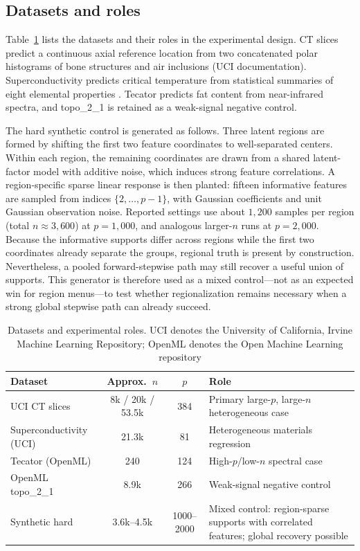 \documentclass[pdflatex,sn-basic,Numbered]{sn-jnl}
\begin{document}
\subsection{Datasets and roles}
\label{sec:datasets}

Table~\ref{tab:datasets} lists the datasets and their roles in the experimental design. CT slices predict a continuous axial reference location from two concatenated polar histograms of bone structures and air inclusions (UCI documentation). Superconductivity predicts critical temperature from statistical summaries of eight elemental properties \cite{hamidieh2018}. Tecator predicts fat content from near-infrared spectra, and topo\_2\_1 is retained as a weak-signal negative control.

The hard synthetic control is generated as follows. Three latent regions are formed by shifting the first two feature coordinates to well-separated centers. Within each region, the remaining coordinates are drawn from a shared latent-factor model with additive noise, which induces strong feature correlations. A region-specific sparse linear response is then planted: fifteen informative features are sampled from indices \(\{2,\ldots,p-1\}\), with Gaussian coefficients and unit Gaussian observation noise. Reported settings use about \(1{,}200\) samples per region (total \(n\approx 3{,}600\)) at \(p=1{,}000\), and analogous larger-\(n\) runs at \(p=2{,}000\). Because the informative supports differ across regions while the first two coordinates already separate the groups, regional truth is present by construction. Nevertheless, a pooled forward-stepwise path may still recover a useful union of supports. This generator is therefore used as a mixed control---not as an expected win for region menus---to test whether regionalization remains necessary when a strong global stepwise path can already succeed.

\begin{table}[t]
\centering
\caption{Datasets and experimental roles. UCI denotes the University of California, Irvine Machine Learning Repository; OpenML denotes the Open Machine Learning repository}
\label{tab:datasets}
\small
\begin{tabularx}{\textwidth}{@{}>{\raggedright\arraybackslash}p{}c c >{\raggedright\arraybackslash}X@{}}
\toprule
Dataset & Approx.\ \(n\) & \(p\) & Role \\
\midrule
UCI CT slices & 8k / 20k / 53.5k & 384 & Primary large-\(p\), large-\(n\) heterogeneous case \\
Superconductivity (UCI) & 21.3k & 81 & Heterogeneous materials regression \\
Tecator (OpenML) & 240 & 124 & High-\(p\)/low-\(n\) spectral case \\
OpenML topo\_2\_1 & 8.9k & 266 & Weak-signal negative control \\
Synthetic hard & 3.6k--4.5k & 1000--2000 & Mixed control: region-sparse supports with correlated features; global recovery possible \\
\bottomrule
\end{tabularx}
\end{table}
\end{document}
